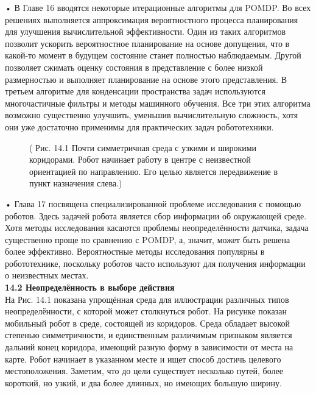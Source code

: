 \documentclass[10pt,a4paper]{article}
\begin{document}
•	В Главе 16 вводятся некоторые итерационные алгоритмы для POMDP. Во всех решениях выполняется аппроксимация вероятностного процесса планирования для улучшения вычислительной эффективности. Один из таких алгоритмов позволит ускорить вероятностное планирование на основе допущения, что в какой-то момент в будущем состояние станет полностью наблюдаемым. Другой позволяет сжимать оценку состояния в представление с более низкой размерностью и выполняет планирование на основе этого представления. В третьем алгоритме для конденсации пространства задач используются многочастичные фильтры и методы машинного обучения. Все три этих алгоритма возможно существенно улучшить, уменьшив вычислительную сложность, хотя они уже достаточно применимы для практических задач робототехники.

\begin{figure}[H]
	\caption{ ( Рис. 14.1 Почти симметричная среда с узкими и широкими коридорами. Робот начинает работу в центре с неизвестной ориентацией по направлению. Его целью является передвижение в пункт назначения слева.) }
	\label{fig:141orig}
\end{figure}

•	Глава 17 посвящена специализированной проблеме исследования с помощью роботов. Здесь задачей робота является сбор информации об окружающей среде. Хотя методы исследования касаются проблемы неопределённости датчика, задача существенно проще по сравнению с POMDP, а, значит, может быть решена более эффективно. Вероятностные методы исследования популярны в робототехнике, поскольку роботов часто используют для получения информации о неизвестных местах.\\

\textbf{14.2	Неопределённость в выборе действия}\\

На Рис. 14.1 показана упрощённая среда для иллюстрации различных типов неопределённости, с которой может столкнуться робот. На рисунке показан мобильный робот в среде, состоящей из коридоров. Среда обладает высокой степенью симметричности, и единственным различимым признаком является дальний конец коридора, имеющий разную форму в зависимости от места на карте. Робот начинает в указанном месте и ищет способ достичь целевого местоположения. Заметим, что до цели существует несколько путей, более короткий, но узкий, и два более длинных, но имеющих большую ширину.
\end{document}
